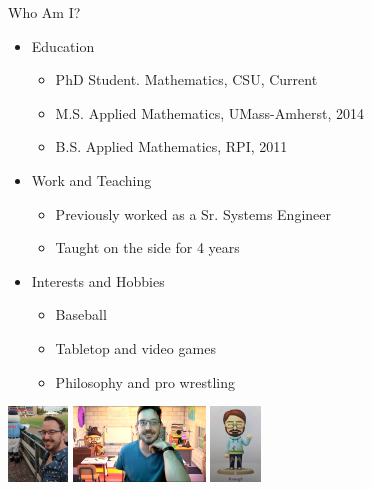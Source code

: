 {}\documentclass[letterpaper,
compress,
xcolor=x11names,
]{beamer}
\begin{document}
\begin{frame}{Who Am I?}
	\begin{itemize}
		\item Education
		\begin{itemize}
			\item PhD Student. Mathematics, CSU, Current
			\item M.S. Applied Mathematics, UMass-Amherst, 2014
			\item B.S. Applied Mathematics, RPI, 2011
		\end{itemize}
		\item Work and Teaching
		\begin{itemize}
			\item Previously worked as a Sr. Systems Engineer
			\item Taught on the side for 4 years
		\end{itemize}
		\item Interests and Hobbies
		\begin{itemize}
			\item Baseball
			\item Tabletop and video games
			\item Philosophy and pro wrestling 
		\end{itemize}
	\end{itemize}
	\begin{center}
		\includegraphics[height = 2cm]{ChrisPawSox.jpg}
		\includegraphics[height = 2cm]{Chris_AC.png}
		\includegraphics[height = 2cm]{ChrisMii.jpg}
	\end{center}
\end{frame}
\end{document}
